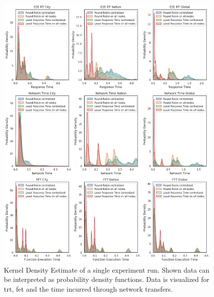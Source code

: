\begin{figure}
    \centering
    \includegraphics[width=\linewidth]{graphics/graphs/initial_eval_pdfs_3x3.png}
    \caption{Kernel Density Estimate of a single experiment run. Shown data can be interpreted as probability density functions. Data is visualized for \gls{trt}, \gls{fet} and the time incurred through network transfers.}
    \label{fig:initial_eval_pdfs}
\end{figure}

